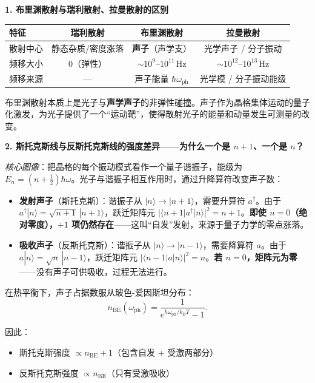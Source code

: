 \begin{insightbox}[物理图像与概念深化]
\textbf{1. 布里渊散射与瑞利散射、拉曼散射的区别}

\begin{center}
\begin{tabular}{lccc}
\toprule
特征 & \textbf{瑞利散射} & \textbf{布里渊散射} & \textbf{拉曼散射} \\
\midrule
散射中心 & 静态杂质/密度涨落 & \textbf{声子}（声学支） & 光学声子 / 分子振动 \\
频移大小 & $0$（弹性） & $\sim 10^{9}\text{--}10^{11}\,\mathrm{Hz}$ & $\sim 10^{12}\text{--}10^{13}\,\mathrm{Hz}$ \\
频移来源 & --- & 声子能量 $\hbar\omega_\mathrm{ph}$ & 光学模 / 分子振动能级 \\
\bottomrule
\end{tabular}
\end{center}

布里渊散射本质上是光子与\textbf{声学声子}的非弹性碰撞。声子作为晶格集体运动的量子化激发，为光子提供了一个``运动靶''，使得散射光子的能量和动量发生可测量的改变。

\textbf{2. 斯托克斯线与反斯托克斯线的强度差异——为什么一个是 $n+1$、一个是 $n$？}

\textit{核心图像}：把晶格的每个振动模式看作一个量子谐振子，能级为 $E_n=(n+\tfrac{1}{2})\hbar\omega$。光子与谐振子相互作用时，通过升降算符改变声子数：

\begin{itemize}
    \item \textbf{发射声子}（斯托克斯）：谐振子从 $|n\rangle\to|n+1\rangle$，需要升算符 $a^\dagger$。由于 $a^\dagger|n\rangle=\sqrt{n+1}\,|n+1\rangle$，跃迁矩阵元 $|\langle n+1|a^\dagger|n\rangle|^2=n+1$。\textbf{即使 $n=0$（绝对零度），$+1$ 项仍然存在}——这叫``自发''发射，来源于量子力学的零点涨落。
    \item \textbf{吸收声子}（反斯托克斯）：谐振子从 $|n\rangle\to|n-1\rangle$，需要降算符 $a$。由于 $a|n\rangle=\sqrt{n}\,|n-1\rangle$，跃迁矩阵元 $|\langle n-1|a|n\rangle|^2=n$。\textbf{若 $n=0$，矩阵元为零}——没有声子可供吸收，过程无法进行。
\end{itemize}

在热平衡下，声子占据数服从玻色-爱因斯坦分布：
\begin{equation}
n_\mathrm{BE}(\omega_\mathrm{ph}) = \frac{1}{e^{\hbar\omega_\mathrm{ph}/k_\mathrm{B}T} - 1}.
\end{equation}

因此：
\begin{itemize}
    \item 斯托克斯强度 $\propto n_\mathrm{BE}+1$（包含自发 + 受激两部分）
    \item 反斯托克斯强度 $\propto n_\mathrm{BE}$（只有受激吸收）
\end{itemize}


\end{insightbox}
